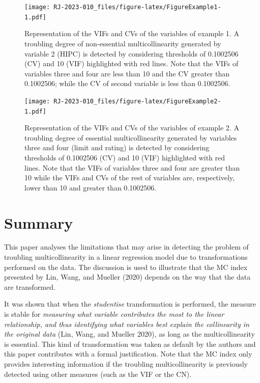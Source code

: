 \begin{figure}
\centering
\texttt{[image: RJ-2023-010\_files/figure-latex/FigureExample1-1.pdf]}
\caption{\label{fig:FigureExample1}Representation of the VIFs and CVs of the variables of example 1. A troubling degree of non-essential multicollinearity generated by variable 2 (HIPC) is detected by considering thresholds of 0.1002506 (CV) and 10 (VIF) highlighted with red lines. Note that the VIFs of variables three and four are less than 10 and the CV greater than 0.1002506; while the CV of second variable is less than 0.1002506.}
\end{figure}

\begin{figure}
\centering
\texttt{[image: RJ-2023-010\_files/figure-latex/FigureExample2-1.pdf]}
\caption{\label{fig:FigureExample2}Representation of the VIFs and CVs of the variables of example 2. A troubling degree of essential multicollinearity generated by variables three and four (limit and rating) is detected by considering thresholds of 0.1002506 (CV) and 10 (VIF) highlighted with red lines. Note that the VIFs of variables three and four are greater than 10 while the VIFs and CVs of the rest of variables are, respectively, lower than 10 and greater than 0.1002506.}
\end{figure}

\hypertarget{summary}{%
\section{Summary}\label{summary}}

This paper analyses the limitations that may arise in detecting the problem of troubling multicollinearity in a linear regression model due to transformations performed on the data. The discussion is used to illustrate that the MC index presented by Lin, Wang, and Mueller (2020) depends on the way that the data are transformed.

It was shown that when the \emph{studentise} transformation is performed, the measure is stable for \emph{measuring what variable contributes the most to the linear relationship, and thus identifying what variables best explain the collinearity in the original data} (Lin, Wang, and Mueller 2020), as long as the multicollinearity is essential. This kind of transformation was taken as default by the authors and this paper contributes with a formal justification. Note that the MC index only provides interesting information if the troubling multicollinearity is previously detected using other measures (such as the VIF or the CN).

